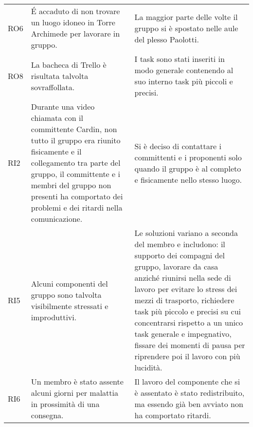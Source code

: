 \begin{longtable}{
		 >{\centering}p{}
		 >{}p{}
		 >{}p{}
	 }
	RO6 &
	\'E accaduto di non trovare un luogo idoneo in Torre Archimede per lavorare in
	gruppo. &
	La maggior parte delle volte il gruppo si è spostato nelle aule del plesso Paolotti.
	\tabularnewline
	
	RO8 &
	La bacheca di Trello è risultata talvolta sovraffollata. &
	I task sono stati inseriti in modo generale contenendo al suo interno task più
	piccoli e precisi.
	\tabularnewline
	
	RI2 &
	Durante una video chiamata con il committente Cardin, non tutto il gruppo era 
	riunito fisicamente e il collegamento tra parte del gruppo, il committente e 
	i membri del gruppo non presenti ha comportato dei problemi e dei ritardi nella
	comunicazione. &
	Si è deciso di contattare i committenti e i proponenti solo quando il gruppo 
	è al completo e fisicamente nello stesso luogo.	
	\tabularnewline
	
	RI5 &
	Alcuni componenti del gruppo sono talvolta visibilmente stressati e improduttivi. &
	Le soluzioni variano a seconda del membro e includono: il supporto dei compagni del gruppo,
	lavorare da casa anziché riunirsi nella sede di lavoro per evitare lo stress 
	dei mezzi di trasporto, richiedere task più piccolo e precisi su cui concentrarsi rispetto 
	a un unico task generale e impegnativo, fissare dei momenti di pausa per riprendere poi il
	lavoro con più lucidità.
	\tabularnewline
	
	RI6 &
	Un membro è stato assente alcuni giorni per malattia in prossimità di una consegna. & 
	Il lavoro del componente che si è assentato è stato redistribuito, ma essendo già
	ben avviato non ha comportato ritardi.
	\tabularnewline
	
		
\end{longtable}
